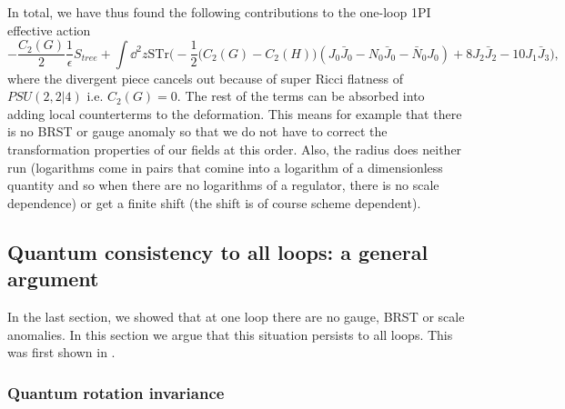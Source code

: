 \documentclass[12pt]{article}
\def\be{\begin{equation}}
\def\ee{\end{equation}}
\numberwithin{equation}{section}
\begin{document}
In total, we have thus found the following contributions to the one-loop 1PI effective action
\be
-\frac{C_2(G)}{2} \frac{1}{\epsilon} S_{tree} + \int \dd^2 z \text{STr}\big(-\frac{1}{2}\big(C_2(G)-C_2(H)\big) (J_0\bar{J}_0 - N_0\bar{J}_0 - \bar{N}_0 J_0) + 8 J_2 \bar{J}_2 - 10 J_1 \bar{J}_3\big),
\ee
where the divergent piece cancels out because of super Ricci flatness of $PSU(2,2|4)$ i.e. $C_2(G) = 0$. The rest of the terms can be absorbed into adding local counterterms to the deformation. This means for example that there is no BRST or gauge anomaly so that we do not have to correct the transformation properties of our fields at this order. Also, the radius does neither run (logarithms come in pairs that comine into a logarithm of a dimensionless quantity and so when there are no logarithms of a regulator, there is no scale dependence) or get a finite shift (the shift is of course scheme dependent).





\subsection{Quantum consistency to all loops: a general argument}
\label{fourthree}
In the last section, we showed that at one loop there are no gauge, BRST or scale anomalies. In this section we argue that this situation persists to all loops. This was first shown in \cite{Berkovits:2004xu}.

\subsubsection{Quantum rotation invariance}
\end{document}
